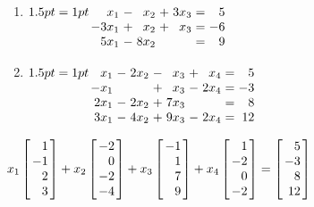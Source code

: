 \begin{multicols}{2}
\begin{ex}
\begin{enumerate}[label={\alph*.}]
\item 
$ \arraycolsep=1pt
\begin{array}[t]{rrrrrrr}
x_{1} & - & x_{2} & + & 3x_{3} & = & 5 \\
-3x_{1} & + & x_{2} & + & x_{3} & = & -6 \\
5x_{1} & - & 8x_{2} & & & = & 9
\end{array}
$


\item
$ \arraycolsep=1pt
\begin{array}[t]{rrrrrrrrr}
x_{1} & - & 2x_{2} & - & x_{3} & + & x_{4} & = & 5 \\
-x_{1} &  &  & + & x_{3} &  - & 2x_{4} & = & -3 \\
2x_{1} & - & 2x_{2} & + & 7x_{3} & & & = & 8 \\
3x_{1} & - & 4x_{2} & + & 9x_{3} & - & 2x_{4} & = & 12
\end{array}
$



\end{enumerate}
\begin{sol}
\begin{enumerate}[label={\alph*.}]
\setcounter{enumi}{1}
$
x_{1} \leftB \begin{array}{r}
1 \\
-1 \\
2 \\
3
\end{array} \rightB + 
x_{2} \leftB \begin{array}{r}
-2 \\
0 \\
-2 \\
-4
\end{array} \rightB + 
x_{3} \leftB \begin{array}{r}
-1 \\
1 \\
7 \\
9
\end{array} \rightB + 
x_{4} \leftB \begin{array}{r}
1 \\
-2 \\
0 \\
-2
\end{array} \rightB = 
\leftB \begin{array}{r}
5 \\
-3 \\
8 \\
12
\end{array} \rightB
$



\end{enumerate}
\end{sol}
\end{ex}
\end{multicols}
